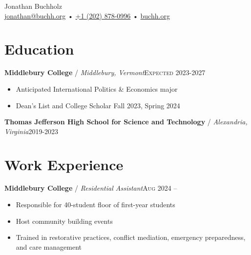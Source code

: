 \documentclass[12pt, a4paper]{article}
\begin{document}
{\LARGE Jonathan Buchholz}\\
\href{mailto:jonathan@buchh.org}{jonathan@buchh.org} • \href{tel:2028780996}{+1 (202) 878-0996} • \href{https://buchh.org}{buchh.org}\\

\vspace{-8mm}
\section*{Education}
\textbf{Middlebury College} / \textit{Middlebury, Vermont}\hfill\textsc{Expected 2023-2027}\\
\begin{itemize}
    \vspace{-8mm}
    \item Anticipated International Politics \& Economics major
    \item Dean's List and College Scholar Fall 2023, Spring 2024
\end{itemize}
\textbf{Thomas Jefferson High School for Science and Technology} / \textit{Alexandria, Virginia}\hfill\textsc{2019-2023}\\
\vspace{-4mm}

\vspace{-6mm}
\section*{Work Experience}
\vspace{-2mm}

\textbf{Middlebury College} / \textit{Residential Assistant}\hfill\textsc{Aug 2024 --}\\
\begin{itemize}
    \vspace{-8mm}
    \item Responsible for 40-student floor of first-year students
    \item Host community building events
    \item Trained in restorative practices, conflict mediation, emergency preparedness, and care management
\end{itemize}
\end{document}
